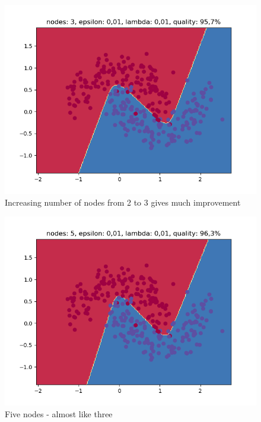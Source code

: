 \documentclass[3p,twocolumn]{elsarticle}
\begin{document}
\begin{figure}[h!]
\label{fig:fig5}
  \includegraphics[width=\linewidth]{wykresy/7.png}
	\caption{ Increasing number of nodes from 2 to 3 gives much improvement}
	\label{fig5}
\end{figure}

\begin{figure}[h!]
\label{fig:fig5}
  \includegraphics[width=\linewidth]{wykresy/13.png}
	\caption{ Five nodes - almost like three}
	\label{fig5}
\end{figure}
\end{document}
